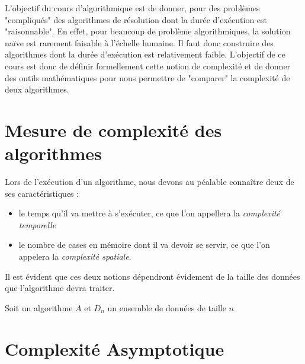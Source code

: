 
\minitoc


L'objectif du cours d'algorithmique est de donner, pour des problèmes "compliqués" des algorithmes de 
résolution dont la durée d'exécution est "raisonnable". 
En effet, pour beaucoup de problème algorithmiques, la solution naïve est rarement faisable à l'échelle 
humaine. Il faut donc construire des algorithmes dont la durée d'exécution est relativement faible. 
L'objectif de ce cours est donc de définir formellement cette notion de complexité et de donner 
des outils mathématiques pour nous permettre de "comparer" la complexité de deux algorithmes. 



\section{Mesure de complexité des algorithmes}

Lors de l'exécution d'un algorithme, nous devons au péalable connaître deux de ses caractéristiques : 
\begin{itemize}
    \item le temps qu'il va mettre à s'exécuter, ce que l'on appellera la \emph{complexité temporelle} 
    \item le nombre de cases en mémoire dont il va devoir se servir, ce que l'on appelera la \emph{complexité spatiale}. 
\end{itemize}
Il est évident que ces deux notions dépendront évidement de la taille des données que l'algorithme devra traiter. 

\begin{definition}
    Soit un algorithme $A$ et $D_n$ un ensemble de données de taille $n  $ 
\end{definition}



\section{Complexité Asymptotique}